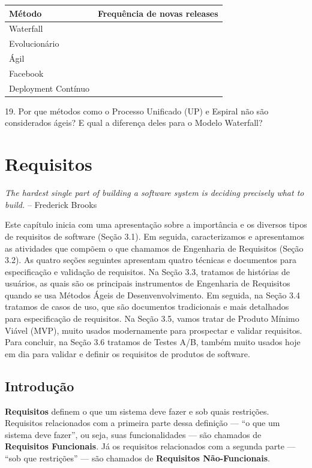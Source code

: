 \documentclass[
  11pt,
  twoside]{book}
\renewenvironment{quote}{\centering \vspace{1.5ex} \begin{tcolorbox}[colback=backcolor, width=4.9in]}{\end{tcolorbox}}
\begin{document}
\begin{longtable}[]{@{}ll@{}}
\toprule
\textbf{Método} & \textbf{Frequência de novas releases}\tabularnewline
\midrule
\endhead
Waterfall &\tabularnewline
Evolucionário &\tabularnewline
Ágil &\tabularnewline
Facebook &\tabularnewline
Deployment Contínuo &\tabularnewline
\bottomrule
\end{longtable}

19. Por que métodos como o Processo Unificado (UP) e Espiral não são
considerados ágeis? E qual a diferença deles para o Modelo Waterfall?

\hypertarget{requisitos}{%
\chapter{Requisitos}\label{requisitos}}

\begin{quote}
\emph{The hardest single part of building a software system is deciding
precisely what to build.} -- Frederick Brooks
\end{quote}

 Este capítulo inicia com uma apresentação sobre a
importância e os diversos tipos de requisitos de software (Seção 3.1).
Em seguida, caracterizamos e apresentamos as atividades que compõem o
que chamamos de Engenharia de Requisitos (Seção 3.2). As quatro seções
seguintes apresentam quatro técnicas e documentos para especificação e
validação de requisitos. Na Seção 3.3, tratamos de histórias de
usuários, as quais são os principais instrumentos de Engenharia de
Requisitos quando se usa Métodos Ágeis de Desenvenvolvimento. Em
seguida, na Seção 3.4 tratamos de casos de uso, que são documentos
tradicionais e mais detalhados para especificação de requisitos. Na
Seção 3.5, vamos tratar de Produto Mínimo Viável (MVP), muito usados
modernamente para prospectar e validar requisitos. Para concluir, na
Seção 3.6 tratamos de Testes A/B, também muito usados hoje em dia para
validar e definir os requisitos de produtos de software.

\hypertarget{introduuxe7uxe3o-1}{%
\section{Introdução}\label{introduuxe7uxe3o-1}}

 \textbf{Requisitos} definem o que um
sistema deve fazer e sob quais restrições. Requisitos relacionados com a
primeira parte dessa definição --- ``o que um sistema deve fazer'', ou
seja, suas funcionalidades --- são chamados de \textbf{Requisitos
Funcionais}. Já os requisitos relacionados com a segunda parte --- ``sob
que restrições'' --- são chamados de \textbf{Requisitos Não-Funcionais}.
\end{document}
